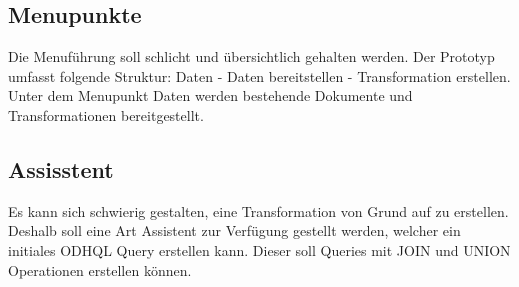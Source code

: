 \subsection{Menupunkte}
Die Menuführung soll schlicht und übersichtlich gehalten werden. Der Prototyp umfasst folgende Struktur: Daten - Daten bereitstellen - Transformation erstellen. \\
Unter dem Menupunkt Daten werden bestehende Dokumente und Transformationen bereitgestellt.\\

\subsection{Assisstent}
Es kann sich schwierig gestalten, eine Transformation von Grund auf zu erstellen. Deshalb soll eine Art Assistent zur Verfügung gestellt werden, welcher ein initiales ODHQL Query erstellen kann. Dieser soll Queries mit JOIN und UNION Operationen erstellen können.


